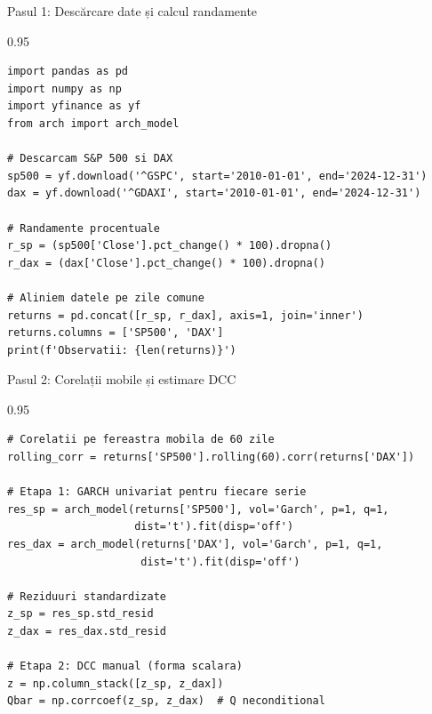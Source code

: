 \documentclass[9pt, aspectratio=169, t]{beamer}
\begin{document}
\begin{frame}[fragile]{Pasul 1: Descărcare date și calcul randamente}
    \begin{cminipage}{0.95\textwidth}
\begin{lstlisting}
import pandas as pd
import numpy as np
import yfinance as yf
from arch import arch_model

# Descarcam S&P 500 si DAX
sp500 = yf.download('^GSPC', start='2010-01-01', end='2024-12-31')
dax = yf.download('^GDAXI', start='2010-01-01', end='2024-12-31')

# Randamente procentuale
r_sp = (sp500['Close'].pct_change() * 100).dropna()
r_dax = (dax['Close'].pct_change() * 100).dropna()

# Aliniem datele pe zile comune
returns = pd.concat([r_sp, r_dax], axis=1, join='inner')
returns.columns = ['SP500', 'DAX']
print(f'Observatii: {len(returns)}')
\end{lstlisting}
    \end{cminipage}
\end{frame}

\begin{frame}[fragile]{Pasul 2: Corelații mobile și estimare DCC}
    \begin{cminipage}{0.95\textwidth}
\begin{lstlisting}
# Corelatii pe fereastra mobila de 60 zile
rolling_corr = returns['SP500'].rolling(60).corr(returns['DAX'])

# Etapa 1: GARCH univariat pentru fiecare serie
res_sp = arch_model(returns['SP500'], vol='Garch', p=1, q=1,
                    dist='t').fit(disp='off')
res_dax = arch_model(returns['DAX'], vol='Garch', p=1, q=1,
                     dist='t').fit(disp='off')

# Reziduuri standardizate
z_sp = res_sp.std_resid
z_dax = res_dax.std_resid

# Etapa 2: DCC manual (forma scalara)
z = np.column_stack([z_sp, z_dax])
Qbar = np.corrcoef(z_sp, z_dax)  # Q neconditional
\end{lstlisting}
    \end{cminipage}
\end{frame}
\end{document}
